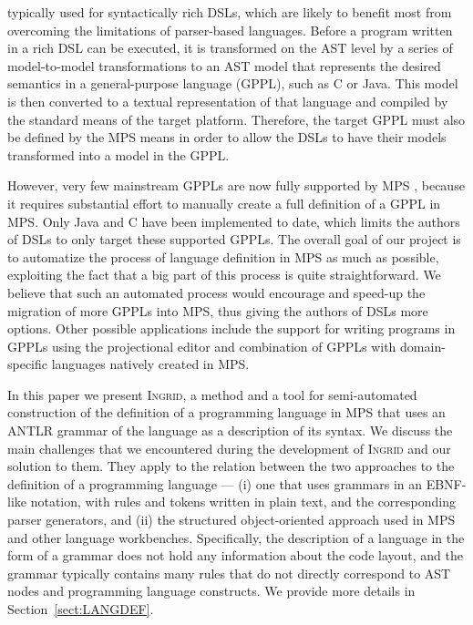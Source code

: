 
 typically used for syntactically rich DSLs, which are likely to benefit most from overcoming the limitations of parser-based languages.
Before a program written in a rich DSL can be executed, it is  transformed on the AST level by a series of model-to-model transformations to an AST model that represents the desired semantics in a general-purpose language (GPPL), such as C or Java.
This model is then converted to a textual representation of that language and compiled by the standard means of the target platform.
Therefore, the target GPPL must also be defined by the MPS means in order to allow the DSLs to have their models transformed into a model in the GPPL.

However, very few mainstream GPPLs are now fully supported by MPS , because it requires substantial effort to manually create a full definition of a GPPL in MPS.
Only Java and C have been implemented to date, which limits the authors of DSLs to only target these supported GPPLs.
The overall goal of our project is to automatize the process of language definition in MPS as much as possible, exploiting the fact that a big part of this process is quite straightforward.
We believe that such an automated process would encourage and speed-up the migration of more GPPLs into MPS, thus giving the authors of DSLs more options.
Other possible applications include the support for writing programs in GPPLs using the projectional editor and combination of GPPLs with domain-specific languages natively created in MPS.

In this paper we present \textsc{Ingrid}, a method and a tool for semi-automated construction of the definition of a programming language in MPS that uses an ANTLR grammar of the language as a description of its syntax.
We discuss the main challenges that we encountered during the development of \textsc{Ingrid} and our solution to them.
They apply to the relation between the two approaches to the definition of a programming language --- (i) one that uses grammars in an EBNF-like notation, with rules and tokens written in plain text, and the corresponding parser generators, and (ii) the structured object-oriented approach used in MPS and other language workbenches.
Specifically, the description of a language in the form of a grammar does not hold any information about the code layout, and the grammar typically contains many rules that do not directly correspond to AST nodes and programming language constructs.
We provide more details in Section~\ref{sect:LANGDEF}.

